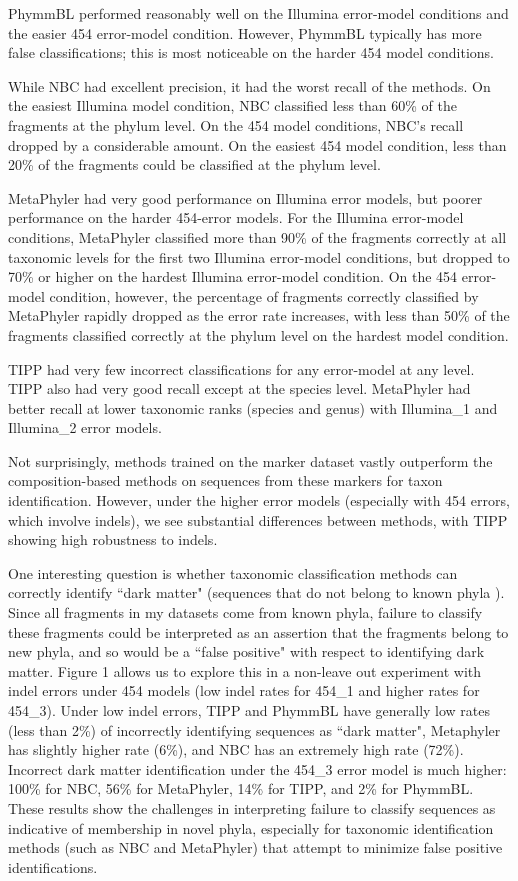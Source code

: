 PhymmBL performed reasonably well on the Illumina error-model conditions and the easier 454 error-model condition.  However, PhymmBL typically has more false classifications; this is most noticeable on the harder 454 model conditions.

While NBC had
excellent precision,  it had the worst recall of the methods.  
On the easiest Illumina model condition, NBC classified 
less than 60\% of the fragments at the phylum level.  
On the 454 model conditions, NBC's recall dropped by a considerable amount.  On the easiest 454 model condition, less than 20\% of the fragments could be classified at the phylum level.

MetaPhyler had very good performance on
Illumina error models, but poorer performance on the harder 454-error models.  For the Illumina error-model conditions,
MetaPhyler classified more than 90\% of the fragments correctly
at all taxonomic levels for the first two Illumina error-model conditions, but
dropped to 70\% or higher on the hardest Illumina error-model
condition.  On the 454 error-model condition, however, the percentage
of fragments
correctly classified by MetaPhyler rapidly dropped as the error rate
increases, with less than 50\% of the fragments classified correctly at
the phylum level on the hardest model condition.  

TIPP had very few incorrect
classifications for any error-model at any level.
 TIPP also had very good recall except
at the species level.
MetaPhyler had better recall at lower taxonomic ranks (species and genus)
with Illumina\_1 and Illumina\_2 error models. 

Not surprisingly, methods trained 
on the marker dataset vastly outperform
the composition-based methods on
sequences from these markers for taxon identification.
However,  
under the higher error models (especially
with 454 errors, which involve indels), we
see substantial differences between methods,
with TIPP showing high robustness to indels.  

One interesting question is whether taxonomic
classification methods can correctly identify
``dark matter" (sequences that do not belong
to known phyla  \cite{dark-matter}).
Since all fragments in my datasets come from known 
phyla, failure to classify these fragments
could be interpreted
as an assertion that the fragments belong to new phyla,
and so
would be a ``false positive" with respect to identifying
dark matter.
Figure 1 allows us to explore
this in a non-leave out experiment with 
indel errors under 454 models (low indel rates
for 454\_1 and higher rates for 454\_3).
Under low indel errors, 
TIPP and PhymmBL have generally low 
rates (less than 2\%) of incorrectly
identifying sequences as ``dark matter",
Metaphyler has slightly higher rate (6\%), and NBC
has an extremely high rate (72\%). 
Incorrect dark matter identification under
the 454\_3 error model is much higher:
100\% for NBC, 
56\% for  MetaPhyler, 
14\% for TIPP, and 2\% for PhymmBL.
These results show the challenges in interpreting failure to
classify sequences as indicative of membership in novel phyla,
especially for taxonomic identification  methods (such
as NBC and MetaPhyler) that 
attempt to minimize false positive identifications.
